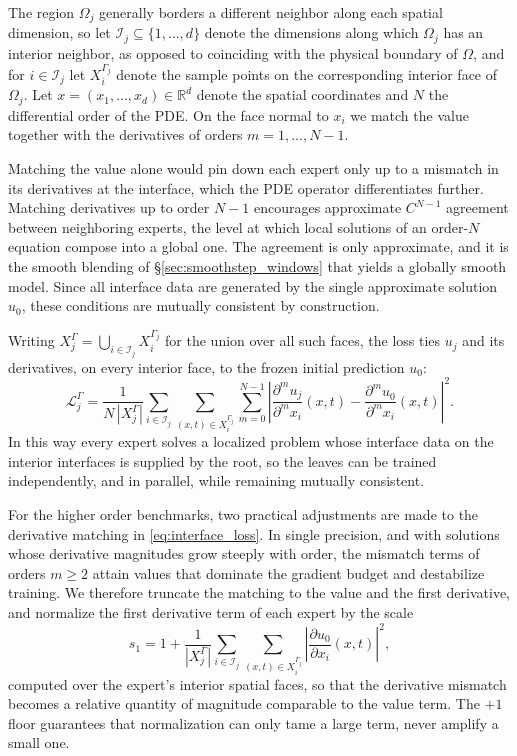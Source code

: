 The region $\Omega_j$ generally borders a different neighbor along
each spatial dimension, so let $\mathcal{I}_j \subseteq \{1,\ldots,d\}$
denote the dimensions along which $\Omega_j$ has an interior neighbor, as
opposed to coinciding with the physical boundary of $\Omega$, and for
$i \in \mathcal{I}_j$ let $X^{\Gamma_j}_i$ denote the sample points on the
corresponding interior face of $\Omega_j$. Let
$x=(x_1,\ldots,x_d)\in\mathbb{R}^d$ denote the spatial coordinates and $N$
the differential order of the PDE. On the face normal to $x_i$ we match the
value together with the derivatives of orders $m=1,\ldots,N-1$.

Matching the value alone would pin down each expert only up to a mismatch in its
derivatives at the interface, which the PDE operator differentiates further. Matching derivatives up to order $N-1$ encourages approximate $C^{N-1}$
agreement between neighboring experts, the level at which local solutions
of an order-$N$ equation compose into a global one. The agreement is only
approximate, and it is the smooth blending of
\S\ref{sec:smoothstep_windows} that yields a globally smooth model. Since all interface data are generated by the single approximate solution $u_0$, these conditions are mutually consistent by construction.

Writing $X^{\Gamma}_j = \bigcup_{i\in\mathcal{I}_j} X^{\Gamma_j}_i$ for the
union over all such faces, the loss ties $u_j$ and its derivatives, on every
interior face, to the frozen initial prediction $u_0$:
\begin{equation}
\mathcal{L}^{\Gamma}_j
= \frac{1}{N\,|X^{\Gamma}_j|}
\sum_{i\in\mathcal{I}_j}
\sum_{(x,t)\in X^{\Gamma_j}_i}
\sum_{m=0}^{N-1}
\left| \frac{\partial^m u_j}{\partial^m x_i}(x,t)
- \frac{\partial^m u_0}{\partial^m x_i}(x,t) \right|^2 .
\label{eq:interface_loss}
\end{equation}
In this way every expert solves a localized problem whose interface data on
the interior interfaces is supplied by the root, so the leaves can be trained independently, and in parallel, while remaining mutually consistent. 

For the higher order benchmarks, two practical adjustments are made to the derivative matching in \eqref{eq:interface_loss}. In single precision, and with solutions whose derivative magnitudes grow steeply with order, the mismatch terms of orders $m \geq 2$ attain values that dominate the gradient budget and destabilize training. We therefore truncate the matching to the value and the first derivative, and normalize the first derivative term of each expert by the scale
\begin{equation}
s_1 = 1 + \frac{1}{|X^{\Gamma}_j|}\sum_{i\in\mathcal{I}_j}\sum_{(x,t)\in X^{\Gamma_j}_i} \left|\frac{\partial u_0}{\partial x_i}(x,t)\right|^2,
\label{eq:derivative_scale}
\end{equation}
computed over the expert's interior spatial faces, so that the derivative mismatch becomes a relative quantity of magnitude comparable to the value term. The $+1$ floor guarantees that normalization can only tame a large term, never amplify a small one.

